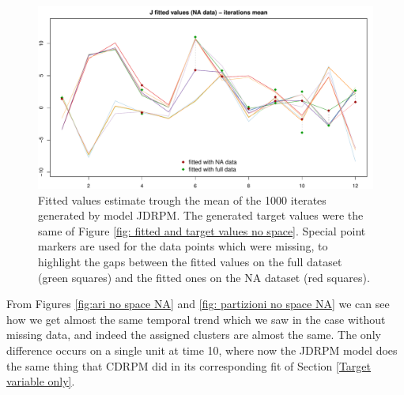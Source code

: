 \documentclass[12pt,	%
	a4paper,		%
	twoside,		%
	openright,		%
	titlepage,%
	]{book}
\theoremstyle{definition}
\begin{document}
\begin{figure}[!ht]
    \centering
    \includegraphics[width=1\linewidth]{Testing/NA data/no space NA/J_mean_prediction.pdf}
    \caption[Fitted values of JDRPM fit, target values only, NA dataset]{Fitted values estimate trough the mean of the 1000 iterates generated by model JDRPM. The generated target values were the same of Figure \ref{fig: fitted and target values no space}. Special point markers are used for the data points which were missing, to highlight the gaps between the fitted values on the full dataset (green squares) and the fitted ones on the NA dataset (red squares).}
    \label{fig: target values estimates no space NA}
\end{figure}

From Figures \ref{fig:ari no space NA} and \ref{fig: partizioni no space NA} we can see how we get almost the same temporal trend which we saw in the case without missing data, and indeed the assigned clusters are almost the same. The only difference occurs on a single unit at time 10, where now the JDRPM model does the same thing that CDRPM did in its corresponding fit of Section \ref{Target variable only}. 
\end{document}

